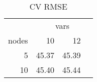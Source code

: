 \begin{table}

\caption{\label{tab:unnamed-chunk-32}CV RMSE}
\centering
\begin{tabular}[t]{r|r|r}
\hline
\multicolumn{1}{c|}{ } & \multicolumn{3}{c}{vars} \\
\cline{2-4}
nodes & 10 & 12\\
\hline
5 & 45.37 & 45.39\\
\hline
10 & 45.40 & 45.44\\
\hline
\end{tabular}
\end{table}